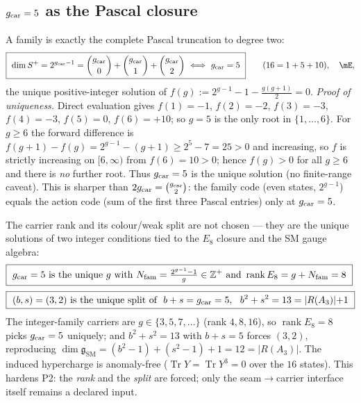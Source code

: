 \subsection{$\gcar=5$ as the Pascal closure}
A family is exactly the complete Pascal truncation to degree two:
\begin{equation}
  \boxed{\ \dim S^+=2^{\gcar-1}=\binom{\gcar}{0}+\binom{\gcar}{1}+\binom{\gcar}{2}\ \Longleftrightarrow\ \gcar=5\ }
  \qquad(16=1+5+10),\quad\mE,
\end{equation}
the unique positive-integer solution of $f(g):=2^{g-1}-1-\tfrac{g(g+1)}{2}=0$. \emph{Proof of
uniqueness.} Direct evaluation gives $f(1){=}{-1}$, $f(2){=}{-2}$, $f(3){=}{-3}$, $f(4){=}{-3}$,
$f(5){=}0$, $f(6){=}{+10}$; so $g{=}5$ is the only root in $\{1,\dots,6\}$. For $g\ge6$ the forward
difference is $f(g{+}1)-f(g)=2^{g-1}-(g{+}1)\ge 2^{5}-7=25>0$ and increasing, so $f$ is strictly
increasing on $[6,\infty)$ from $f(6){=}10>0$; hence $f(g)>0$ for all $g\ge6$ and there is \emph{no}
further root. Thus $\gcar=5$ is the unique solution (no finite-range caveat). 
This is sharper than $2g_{\mathrm{car}}=\binom{g_{\mathrm{car}}}{2}$: the family code (even states, $2^{g-1}$) equals the action
code (sum of the first three Pascal entries) only at $\gcar=5$.

\begin{keybox}[Carrier uniqueness theorem: $\gcar=5$ and the $3{+}2$ split are forced \mE]
The carrier rank and its colour/weak split are not chosen --- they are the unique solutions of two
integer conditions tied to the $E_8$ closure and the SM gauge algebra:
\begin{align}
  &\boxed{\ \gcar=5\ \text{is the unique }g\text{ with } \Nfam=\tfrac{2^{g-1}-1}{g}\in\Z^+\ \text{and}\ \operatorname{rank}E_8=g+\Nfam=8\ }\\[2pt]
  &\boxed{\ (b,s)=(3,2)\ \text{is the unique split of }\ b+s=\gcar=5,\ \ b^2+s^2=13=|R(A_3)|{+}1\ }
\end{align}
The integer-family carriers are $g\in\{3,5,7,\dots\}$ (rank $4,8,16$), so $\operatorname{rank}E_8=8$ picks
$\gcar=5$ uniquely; and $b^2+s^2=13$ with $b{+}s=5$ forces $(3,2)$, reproducing
$\dim\mathfrak g_{\mathrm{SM}}=(b^2{-}1)+(s^2{-}1)+1=12=|R(A_3)|$. The induced hypercharge is anomaly-free
($\operatorname{Tr}Y=\operatorname{Tr}Y^3=0$ over the $16$ states). This hardens P2: the \emph{rank} and
the \emph{split} are forced; only the seam$\to$carrier interface itself remains a declared input.
\end{keybox}

